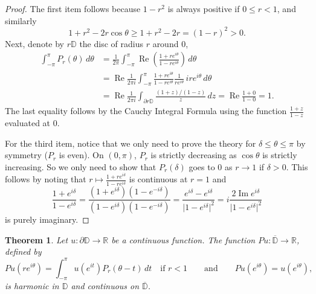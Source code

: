 \documentclass[12pt,openany]{book}
\renewcommand{\Re}{\operatorname{Re}}
\renewcommand{\Im}{\operatorname{Im}}
\newcommand{\sabs}[1]{\lvert {#1} \rvert}
\newcommand{\R}{{\mathbb{R}}}
\newcommand{\D}{{\mathbb{D}}}
\theoremstyle{plain}
\newtheorem{thm}{Theorem}[section]
\theoremstyle{remark}
\theoremstyle{definition}
\theoremstyle{exercise}
\theoremstyle{example}
\begin{document}
\begin{proof}
The first item follows because $1-r^2$ is always positive if $0 \leq r < 1$,
and similarly
\begin{equation*}
1+r^2-2r \cos\theta \geq 1+r^2-2r = {(1-r)}^2 > 0 .
\end{equation*}
Next, denote by $r\D$ the disc of radius $r$ around 0,
\begin{equation*}
\begin{split}
\int_{-\pi}^{\pi}
P_r(\theta) \, d\theta
& =
\frac{1}{2\pi}
\int_{-\pi}^{\pi}
\Re
\left(
\frac{1+re^{i\theta}}{1-re^{i\theta}}
\right)
\, d\theta
\\
& =
\Re
\frac{1}{2\pi i}
\int_{-\pi}^{\pi}
\frac{1+re^{i\theta}}{1-re^{i\theta}} \frac{1}{re^{i\theta}} \,
ire^{i\theta}
\, d\theta
\\
& = 
\Re
\frac{1}{2\pi i}
\int_{\partial r\D}
\frac{(1+z)/(1-z)}{z} \, dz
=
\Re \frac{1+0}{1-0} = 1 .
\end{split}
\end{equation*}
The last equality follows by the Cauchy Integral Formula
using the function $\frac{1+z}{1-z}$ evaluated at 0.

For the third item, notice that we only need to prove the
theory for $\delta \leq \theta \leq \pi$ by symmetry ($P_r$ is even).
On $(0,\pi)$, $P_r$ is strictly decreasing as $\cos \theta$ is strictly
increasing.  So we only need to show that $P_r(\delta)$ goes to 0
as $r \to 1$ if $\delta > 0$.
This follows by noting that $r \mapsto
\frac{1+re^{i\delta}}{1-re^{i\delta}}$
is continuous at $r=1$ and
\begin{equation*}
\frac{1+e^{i\delta}}{1-e^{i\delta}}
=
\frac{(1+e^{i\delta})(1-e^{-i\delta})}{(1-e^{i\delta})(1-e^{-i\delta})}
=
\frac{e^{i\delta}-e^{i\delta}}{\sabs{1-e^{i\delta}}^2}
=
i \frac{2\Im e^{i\delta}}{\sabs{1-e^{i\delta}}^2}
\end{equation*}
is purely imaginary.
\end{proof}

\begin{thm} \label{thm:dirichsol}
Let $u \colon \partial \D \to \R$ be a continuous function.
The function
$Pu \colon \overline{\D} \to \R$, defined by
\begin{equation*}
Pu(re^{i\theta})
=
\int_{-\pi}^\pi u(e^{it}) P_r(\theta-t) \, dt
\quad \text{if $r < 1$} \qquad \text{and} \qquad
Pu(e^{i\theta}) = u(e^{i\theta}),
\end{equation*}
is harmonic in $\D$ and continuous on $\overline{\D}$.
\end{thm}
\end{document}
